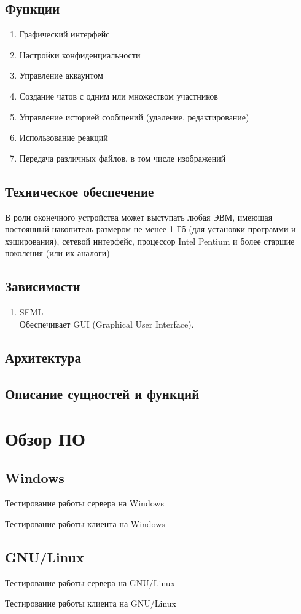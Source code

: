 \documentclass[a4paper,12pt]{article}
\begin{document}
\subsection{Функции}
\begin{enumerate}
    \item Графический интерфейс
    \item Настройки конфиденциальности
    \item Управление аккаунтом
    \item Создание чатов с одним или множеством участников
    \item Управление историей сообщений (удаление, редактирование)
    \item Использование реакций
    \item Передача различных файлов, в том числе изображений
\end{enumerate}

\subsection{Техническое обеспечение}
    В роли оконечного устройства может выступать любая ЭВМ, имеющая постоянный накопитель размером не менее 1 Гб (для установки программи и хэширования), сетевой интерфейс, процессор Intel Pentium и более старшие поколения (или их аналоги)

\subsection{Зависимости}
\begin{enumerate}
    \item SFML \\
    Обеспечивает GUI (Graphical User Interface).
\end{enumerate}

\subsection{Архитектура}


\subsection{Описание сущностей и функций}


\section{Обзор ПО}
\subsection{Windows}
    Тестирование работы сервера на Windows
    
    Тестирование работы клиента на Windows 
    

\subsection{GNU/Linux}
    Тестирование работы сервера на GNU/Linux
    
    Тестирование работы клиента на GNU/Linux
    
\end{document}
